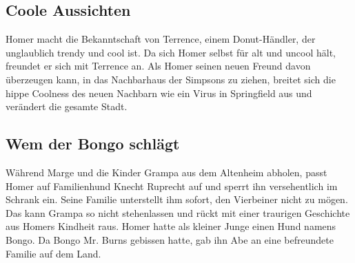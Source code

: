 
\subsection{Coole Aussichten}\label{PABF20}
Homer macht die Bekanntschaft von Terrence, einem Donut-Händler, der unglaublich trendy und cool ist. Da sich Homer selbst für alt und uncool hält, freundet er sich mit Terrence an. Als Homer seinen neuen Freund davon überzeugen kann, in das Nachbarhaus der Simpsons zu ziehen, breitet sich die hippe Coolness des neuen Nachbarn wie ein Virus in Springfield aus und verändert die gesamte Stadt.


\subsection{Wem der Bongo schlägt}\label{RABF01}
Während Marge und die Kinder Grampa aus dem Altenheim abholen, passt Homer auf Familienhund Knecht Ruprecht auf und sperrt ihn versehentlich im Schrank ein. Seine Familie unterstellt ihm sofort, den Vierbeiner nicht zu mögen. Das kann Grampa so nicht stehenlassen und rückt mit einer traurigen Geschichte aus Homers Kindheit raus. Homer hatte als kleiner Junge einen Hund namens Bongo. Da Bongo Mr. Burns gebissen hatte, gab ihn Abe an eine befreundete Familie auf dem Land.


